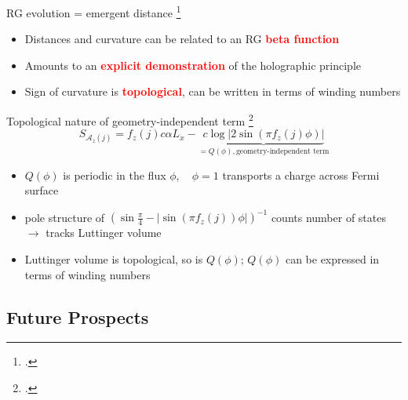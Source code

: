 \documentclass[11pt,aspectratio=169]{beamer}
\newcommand{\focus}[1]{\textcolor{red}{\bf{#1}}}
\begin{document}
\begin{frame}{RG evolution = emergent distance}
	\footcite{maldacena1999large,ryu2006aspects,holzhey_1994}
\begin{itemize}
	\item Distances and curvature can be related to an RG \focus{beta function}\\[10pt]
	\item Amounts to an \focus{explicit demonstration} of the holographic principle\\[10pt]
	\item Sign of curvature is \focus{topological}, can be written in terms of winding numbers\\[10pt]
\end{itemize}
	
\end{frame}

\begin{frame}{Topological nature of geometry-independent term}
	\footcite{luttinger1960ground,luttinger1960fermi,oshikawa2000topological,seki2017topological,anirbanurg1,Heath_2020}
	\[S_{\mathcal{A}_z(j)} = f_z(j) c \alpha L_x - \underbrace{c \log \big|2\sin\left(\pi f_z(j)\phi\right)\big|}_{=Q(\phi),\text{geometry-independent term}}\]
	\begin{itemize}
	\item \(Q(\phi)\) is periodic in the flux \(\phi\), ~ \(\phi=1\) transports a charge across Fermi surface\\[10pt]
	\item pole structure of \(\left(\sin \frac{\pi}{4} - |\sin\left(\pi f_z(j)\right)\phi|\right)^{-1}\) counts number of states \(\longrightarrow\) tracks Luttinger volume\\[10pt]
	\item Luttinger volume is topological, so is \(Q(\phi)\); \(Q(\phi)\) can be expressed in terms of winding numbers
	\end{itemize}
	
\end{frame}

\begin{frame}{}
\section{Future Prospects}
\end{frame}
\end{document}
